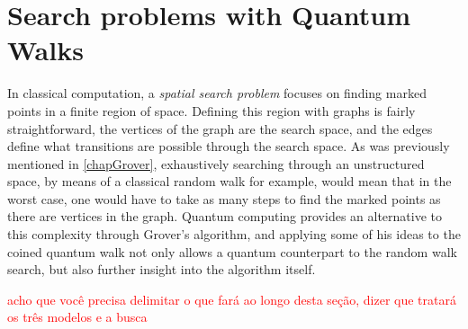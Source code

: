         \section{Search problems with Quantum Walks}
               In classical computation, a \textit{spatial search problem} focuses on finding marked points in a finite region of space. Defining this region with graphs is fairly straightforward, the vertices of the graph are the search space, and the edges define what transitions are possible through the search space. As was previously mentioned in \ref{chapGrover}, exhaustively searching through an unstructured space, by means of a classical random walk for example, would mean that in the worst case, one would have to take as many steps to find the marked points as there are vertices in the graph. Quantum computing provides an alternative to this complexity through Grover's algorithm, and applying some of his ideas to the coined quantum walk not only allows a quantum counterpart to the random walk search, but also further insight into the algorithm itself.\par
                \textcolor{red}{acho que você precisa delimitar o que fará ao longo desta seção, dizer que tratará os três modelos e a busca}
